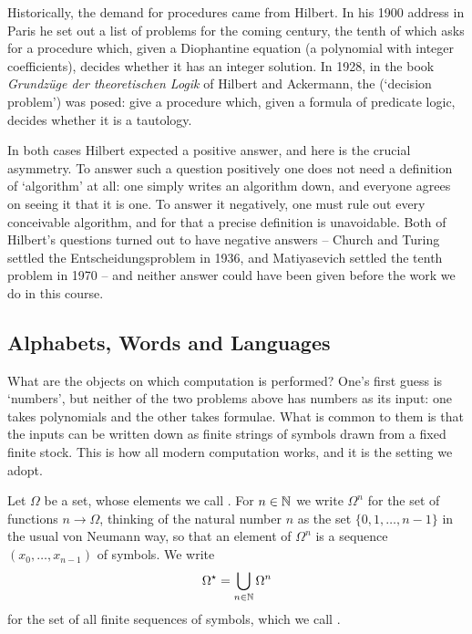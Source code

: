 \documentclass[a4paper]{scrartcl}
\begin{document}
Historically, the demand for procedures came from Hilbert. In his 1900 address in Paris he set out a list of problems for the coming century, the tenth of which asks for a procedure which, given a Diophantine equation (a polynomial with integer coefficients), decides whether it has an integer solution. In 1928, in the book \emph{Grundz\"uge der theoretischen Logik} of Hilbert and Ackermann, the  (`decision problem') was posed: give a procedure which, given a formula of predicate logic, decides whether it is a tautology.

In both cases Hilbert expected a positive answer, and here is the crucial asymmetry. To answer such a question positively one does not need a definition of `algorithm' at all: one simply writes an algorithm down, and everyone agrees on seeing it that it is one. To answer it negatively, one must rule out every conceivable algorithm, and for that a precise definition is unavoidable. Both of Hilbert's questions turned out to have negative answers -- Church and Turing settled the Entscheidungsproblem in 1936, and Matiyasevich settled the tenth problem in 1970 -- and neither answer could have been given before the work we do in this course.

\subsection{Alphabets, Words and Languages}

What are the objects on which computation is performed? One's first guess is `numbers', but neither of the two problems above has numbers as its input: one takes polynomials and the other takes formulae. What is common to them is that the inputs can be written down as finite strings of symbols drawn from a fixed finite stock. This is how all modern computation works, and it is the setting we adopt.

\begin{definition}[Strings]
	Let $\Omega$ be a set, whose elements we call . For $n \in \mathbb{N}$ we write $\Omega^n$ for the set of functions $n \to \Omega$, thinking of the natural number $n$ as the set $\{0, 1, \dots, n-1\}$ in the usual von Neumann way, so that an element of $\Omega^n$ is a sequence $(x_0, \dots, x_{n-1})$ of symbols. We write
	$$\Omega^\star = \bigcup_{n \in \mathbb{N}} \Omega^n$$
	for the set of all finite sequences of symbols, which we call .
\end{definition}
\end{document}
